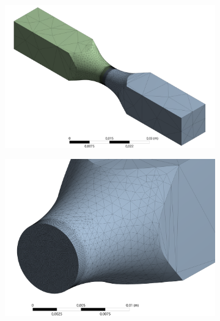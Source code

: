\begin{figure}[p]
\centering
	\begin{subfigure}{0.5\linewidth}
		\centering
		\includegraphics[width=1\linewidth]{Imagenes/mgen_iso.png}
		\caption{}\label{fig:mgen_iso}
	\end{subfigure}%
	\begin{subfigure}{0.5\linewidth}
		\centering
		\includegraphics[width=1\linewidth]{Imagenes/mdet_iso.png}
		\caption{}\label{fig:mdet_iso}
	\end{subfigure}
	\par\bigskip
	\par\bigskip
	\begin{subfigure}{0.5\linewidth}
		\centering

\end{subfigure}
\end{figure}
